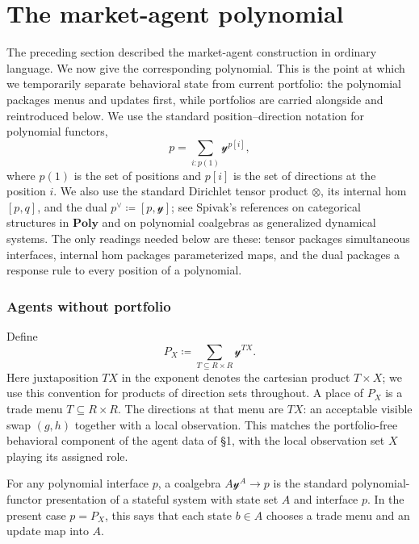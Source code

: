 \documentclass[11pt, one side, article]{memoir}
\theoremstyle{definition}
\theoremstyle{plain}
\newcommand{\Cat}[1]{\mathbf{#1}}%
\newcommand{\yon}{{\mathcal{y}}}
\newcommand{\poly}{\Cat{Poly}}
\newcommand{\0}{\textsf{0}}
\newcommand{\1}{\tn{\textsf{1}}}
\begin{document}
\section*{The market-agent polynomial}

The preceding section described the market-agent construction in ordinary language.  We now give the corresponding polynomial.  This is the point at which we temporarily separate behavioral state from current portfolio: the polynomial packages menus and updates first, while portfolios are carried alongside and reintroduced below.  We use the standard position--direction notation for polynomial functors,
\[
p=\sum_{i:p(1)}\yon^{p[i]},
\]
where $p(1)$ is the set of positions and $p[i]$ is the set of directions at the position $i$.  We also use the standard Dirichlet tensor product $\otimes$, its internal hom $[p,q]$, and the dual $p^\vee\coloneqq[p,\yon]$; see Spivak's references on categorical structures in $\poly$ and on polynomial coalgebras as generalized dynamical systems.  The only readings needed below are these: tensor packages simultaneous interfaces, internal hom packages parameterized maps, and the dual packages a response rule to every position of a polynomial.

\subsubsection*{Agents without portfolio}

Define
\[
P_X \coloneqq \sum_{T\subseteq R\times R} \yon^{T X}.
\]
Here juxtaposition $TX$ in the exponent denotes the cartesian product $T\times X$; we use this convention for products of direction sets throughout.  A place of $P_X$ is a trade menu $T\subseteq R\times R$.  The directions at that menu are $T X$: an acceptable visible swap $(g,h)$ together with a local observation.  This matches the portfolio-free behavioral component of the agent data of \S1, with the local observation set $X$ playing its assigned role.

For any polynomial interface $p$, a coalgebra $A\yon^A \to p$ is the standard polynomial-functor presentation of a stateful system with state set $A$ and interface $p$.  In the present case $p=P_X$, this says that each state $b\in A$ chooses a trade menu and an update map into $A$.
\end{document}
